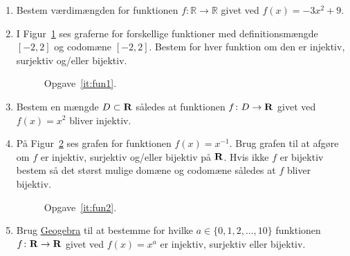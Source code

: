 \begin{enumerate}
	\item Bestem værdimængden for funktionen $f\colon \mathbb{R}\to \mathbb{R}$ givet ved $f(x)=-3x^2+9$.
	
	\item \label{it:fun1} I Figur~\ref{fig:fun1} ses graferne for forskellige funktioner med definitionsmængde $[-2,2]$ og codomæne $[-2,2]$. Bestem for hver funktion om den er injektiv, surjektiv og/eller bijektiv.
	\begin{figure}
		\centering
	\caption{Opgave~\ref{it:fun1}.}
	\label{fig:fun1}
	\end{figure}

	\item Bestem en mængde $D\subset \mathbf{R}$ således at funktionen $f\colon D\to \mathbf{R}$ givet ved $f(x)=x^2$ bliver injektiv.
	
	\item \label{it:fun2} På Figur~\ref{fig:fun2} ses grafen for funktionen $f(x)=x^{-1}$. Brug grafen til at afgøre om $f$ er injektiv, surjektiv og/eller bijektiv på $\mathbf{R}$. Hvis ikke $f$ er bijektiv bestem så det størst mulige domæne og codomæne således at $f$ bliver bijektiv.
	
	\begin{figure}
		\centering
		\caption{Opgave~\ref{it:fun2}.}
		\label{fig:fun2}
	\end{figure}

	\item Brug \href{https://www.geogebra.org/m/eEE7RXzU}{Geogebra} til at bestemme for hvilke $a\in \{0,1,2,\dots,10\}$ funktionen $f\colon \mathbf{R}\to \mathbf{R}$ givet ved $f(x)=x^a$ er injektiv, surjektiv eller bijektiv. 
	

\end{enumerate}
